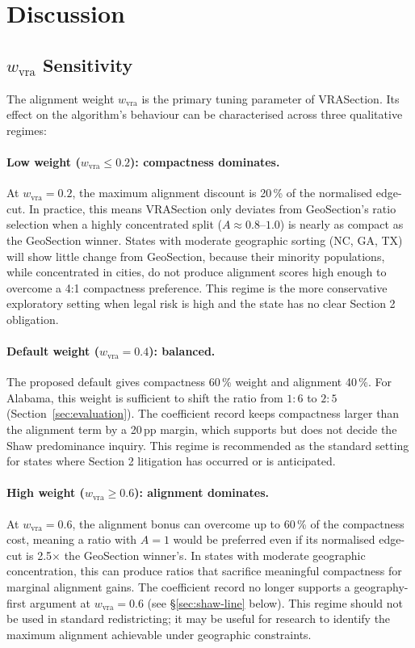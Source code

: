 \section{Discussion}
\label{sec:discussion}

\subsection{\texorpdfstring{$w_\text{vra}$}{w-vra} Sensitivity}

The alignment weight $w_\text{vra}$ is the primary tuning parameter of
VRASection.
Its effect on the algorithm's behaviour can be characterised across
three qualitative regimes:

\paragraph{Low weight ($w_\text{vra} \leq 0.2$): compactness dominates.}
At $w_\text{vra} = 0.2$, the maximum alignment discount is 20\,\% of the
normalised edge-cut.
In practice, this means VRASection only deviates from GeoSection's
ratio selection when a highly concentrated split ($A \approx 0.8$--$1.0$)
is nearly as compact as the GeoSection winner.
States with moderate geographic sorting (NC, GA, TX) will show little
change from GeoSection, because their minority populations, while
concentrated in cities, do not produce alignment scores high enough to
overcome a 4:1 compactness preference.
This regime is the more conservative exploratory setting when legal risk is
high and the state has no clear Section 2 obligation.

\paragraph{Default weight ($w_\text{vra} = 0.4$): balanced.}
The proposed default gives compactness 60\,\% weight and alignment 40\,\%.
For Alabama, this weight is sufficient to shift the ratio from $1:6$ to $2:5$
(Section~\ref{sec:evaluation}).
The coefficient record keeps compactness larger than the alignment term by a
20\,pp margin, which supports but does not decide the Shaw predominance inquiry.
This regime is recommended as the standard setting for states where
Section 2 litigation has occurred or is anticipated.

\paragraph{High weight ($w_\text{vra} \geq 0.6$): alignment dominates.}
At $w_\text{vra} = 0.6$, the alignment bonus can overcome up to 60\,\% of
the compactness cost, meaning a ratio with $A = 1$ would be preferred
even if its normalised edge-cut is 2.5$\times$ the GeoSection winner's.
In states with moderate geographic concentration, this can produce ratios
that sacrifice meaningful compactness for marginal alignment gains.
The coefficient record no longer supports a geography-first argument at
$w_\text{vra} = 0.6$
(see \S\ref{sec:shaw-line} below).
This regime should not be used in standard redistricting; it may be useful
for research to identify the maximum alignment achievable under geographic
constraints.

